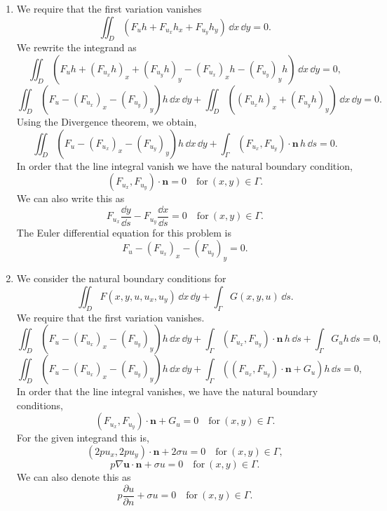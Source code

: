 \begin{Solution}
  \begin{enumerate}
  \item
    We require that the first variation vanishes
    \[
    \iint_D \left(F_u h + F_{u_x} h_x + F_{u_y} h_y \right)\,\dd x\,\dd y = 0.
    \]
    We rewrite the integrand as
    \[
    \iint_D \left(F_u h + (F_{u_x} h)_x + (F_{u_y} h)_y 
      - (F_{u_x})_x h - (F_{u_y})_y h \right) \,\dd x\,\dd y = 0,
    \] 
    \[
    \iint_D \left(F_u - (F_{u_x})_x - (F_{u_y})_y \right) h \,\dd x\,\dd y 
    + \iint_D \left( (F_{u_x} h)_x + (F_{u_y} h)_y \right) \,\dd x\,\dd y = 0.
    \] 
    Using the Divergence theorem, we obtain,
    \[
    \iint_D \left(F_u - (F_{u_x})_x - (F_{u_y})_y \right) h \,\dd x\,\dd y 
    + \int_{\Gamma} (F_{u_x}, F_{u_y}) \cdot \mathbf{n} \,h \,\dd s = 0.
    \] 
    In order that the line integral vanish we have the natural boundary condition,
    \[
    \boxed{
      (F_{u_x}, F_{u_y}) \cdot \mathbf{n} = 0 \quad \mathrm{for}\ (x,y) \in \Gamma.
      }
    \] 
    We can also write this as
    \[
    F_{u_x} \frac{\dd y}{\dd s} - F_{u_y} \frac{\dd x}{\dd s} = 0 \quad \mathrm{for}\ (x,y) 
    \in \Gamma.
    \] 
    The Euler differential equation for this problem is
    \[
    F_u - (F_{u_x})_x - (F_{u_y})_y = 0.
    \]
  \item
    We consider the natural boundary conditions for 
    \[
    \iint_D F(x,y,u,u_x,u_y) \,\dd x\,\dd y + \int_\Gamma G(x,y,u)\,\dd s.
    \]
    We require that the first variation vanishes.
    \[
    \iint_D \left(F_u - (F_{u_x})_x - (F_{u_y})_y \right) h \,\dd x\,\dd y 
    + \int_{\Gamma} (F_{u_x}, F_{u_y}) \cdot \mathbf{n} \,h \,\dd s 
    + \int_\Gamma G_u h \,\dd s = 0,
    \] 
    \[
    \iint_D \left(F_u - (F_{u_x})_x - (F_{u_y})_y \right) h \,\dd x\,\dd y 
    + \int_{\Gamma} \left( (F_{u_x}, F_{u_y}) \cdot \mathbf{n} + G_u \right) 
    h \,\dd s = 0,
    \] 
    In order that the line integral vanishes, we have the natural boundary 
    conditions,
    \[
    (F_{u_x}, F_{u_y}) \cdot \mathbf{n} + G_u = 0 
    \quad \mathrm{for}\ (x,y) \in \Gamma.
    \]
    For the given integrand this is,
    \[
    (2 p u_x, 2 p u_y) \cdot \mathbf{n} + 2 \sigma u = 0
    \quad \mathrm{for}\ (x,y) \in \Gamma,
    \]
    \[
    \boxed{
      p \nabla \mathbf{u} \cdot \mathbf{n} + \sigma u = 0
      \quad \mathrm{for}\ (x,y) \in \Gamma.
      }
    \]
    We can also denote this as
    \[
    p \frac{\partial u}{\partial n} + \sigma u = 0
    \quad \mathrm{for}\ (x,y) \in \Gamma.
    \]
  \end{enumerate}
\end{Solution}



